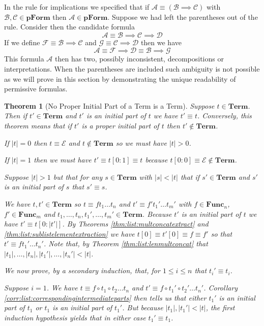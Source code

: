 \documentclass[12pt]{article}
\theoremstyle{break}
\theoremstyle{break}
\newtheorem{theorem}{Theorem}[section]
\theoremstyle{break}
\theoremstyle{break}
\theoremstyle{break}
\newtheorem{informal definition}[definition]{Informal Definition}
\newcommand{\mc}[1]{\mathcal{#1}}
\begin{document}
In the rule for implications we specified that if $\mc{A}\equiv (\mc{B}\implies \mc{C})$ with $\mc{B},\mc{C}\in\textbf{pForm}$ then $\mc{A}\in\textbf{pForm}$.
Suppose we had left the parentheses out of the rule.
Consider then the candidate formula
$$
\mc{A}\equiv \mc{B}\implies \mc{C}\implies \mc{D}
$$
If we define $\mc{F} \equiv \mc{B}\implies \mc{C}$ and $\mc{G}\equiv \mc{C}\implies \mc{D}$ then we have
$$
\mc{A}\equiv \mc{F}\implies \mc{D} \equiv \mc{B}\implies \mc{G}
$$
This formula $\mc{A}$ then has two, possibly inconsistent, decompositions or interpretations.
When the parentheses are included such ambiguity is not possible as we will prove in this section by demonstrating the unique readability of permissive formulas.


\begin{theorem}[No Proper Initial Part of a Term is a Term]
\label{thm:read:termnopropinit}
Suppose $t \in\textbf{Term}$.
Then if $t'\in\textbf{Term}$ and $t'$ is an initial part of $t$ we have $t'\equiv t$.
Conversely, this theorem means that if $t'$ is a proper initial part of $t$ then $t'\not\in\textbf{Term}$.


If $|t|=0$ then $t\equiv \mc{E}$ and $t\not \in \textbf{Term}$ so we must have $|t|>0$.

If $|t|=1$ then we must have $t'\equiv t[0:1]\equiv t$ because $t[0:0]\equiv \mc{E}\not\in\textbf{Term}$.

Suppose $|t|>1$ but that for any $s\in\textbf{Term}$ with $|s|<|t|$ that if $s'\in\textbf{Term}$  and $s'$ is an initial part of $s$ that $s'\equiv s$.

We have $t, t' \in \textbf{Term}$ so $t\equiv f t_1\ldots t_n$ and $t' \equiv f' t_1'\ldots t_m'$ with $f\in\textbf{Func}_n$, $f'\in\textbf{Func}_m$ and $t_1, \ldots,t_n,t_1',\ldots,t_m'\in\textbf{Term}$.
Because $t'$ is an initial part of $t$ we have $t' \equiv t[0:|t'|]$.
By Theorems \ref{thm:list:multconcatextract} and \ref{thm:list:sublistelementextraction} we have $t[0]\equiv t'[0] \equiv f\equiv f'$ so that $t' \equiv f t_1'\ldots t_n'$.
Note that, by Theorem \ref{thm:list:lenmultconcat} that $|t_1|,\ldots,|t_n|,|t_1'|,\ldots,|t_n'| < |t|$.

We now prove, by a secondary induction, that, for $1\le i \le n$ that $t_i'\equiv t_i$.

Suppose $i=1$.
We have $t\equiv f \circ t_1 \circ t_2\ldots t_n$ and $t' \equiv f \circ t_1' \circ t_2'\ldots t_n'$.
Corollary \ref{corr:list:correspondingintermediateparts} then tells us that either $t_1'$ is an initial part of $t_1$ or $t_1$ is an initial part of $t_1'$.
But because $|t_1|, |t_1'|<|t|$, the first induction hypothesis yields that in either case $t_1'\equiv t_1$.


\end{theorem}
\end{document}
